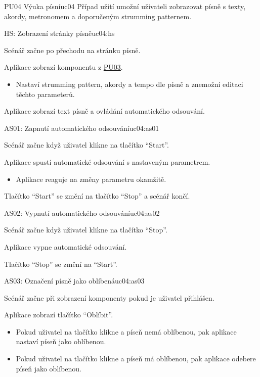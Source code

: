 \begin{usecase}{PU04 Výuka písní}{uc04}
    Případ užití umožní uživateli zobrazovat písně s texty, akordy, metronomem a doporučeným strumming patternem.

    \begin{scenario}{HS: Zobrazení stránky písně}{uc04:hs}
        \item Scénář začne po přechodu na stránku písně.
        \item Aplikace zobrazí komponentu z \hyperref[uc03]{PU03}.
        \begin{itemize}
            \item Nastaví strumming pattern, akordy a tempo dle písně a znemožní editaci těchto parameterů.
        \end{itemize}
        \item Aplikace zobrazí text písně a ovládání automatického odsouvání.
    \end{scenario}

    \begin{scenario}{AS01: Zapnutí automatického odsouvání}{uc04:as01}
        \item Scénář začne když uživatel klikne na tlačítko \enquote{Start}.
        \item Aplikace spustí automatické odsouvání s nastaveným parametrem.
        \begin{itemize}
            \item Aplikace reaguje na změny parametru okamžitě.
        \end{itemize}
        \item Tlačítko \enquote{Start} se změní na tlačítko \enquote{Stop} a scénář končí.
    \end{scenario}

    \begin{scenario}{AS02: Vypnutí automatického odsouvání}{uc04:as02}
        \item Scénář začne když uživatel klikne na tlačítko \enquote{Stop}.
        \item Aplikace vypne automatické odsouvání.
        \item Tlačítko \enquote{Stop} se změní na \enquote{Start}.
    \end{scenario}

    \begin{scenario}{AS03: Označení písně jako oblíbená}{uc04:as03}
        \item Scénář začne při zobrazení komponenty pokud je uživatel přihlášen.
        \item Aplikace zobrazí tlačítko \enquote{Oblíbit}.
        \begin{itemize}
            \item Pokud uživatel na tlačítko klikne a píseň nemá oblíbenou, pak aplikace nastaví píseň jako oblíbenou.
            \item Pokud uživatel na tlačítko klikne a píseň má oblíbenou, pak aplikace odebere píseň jako oblíbenou.
        \end{itemize}
    \end{scenario}
\end{usecase}
